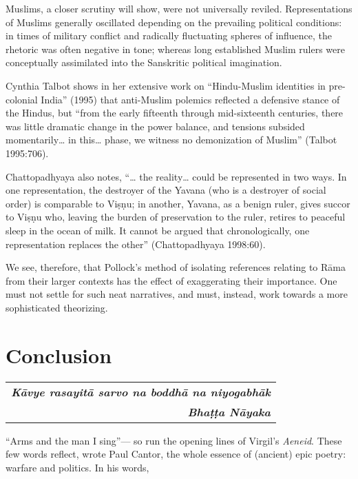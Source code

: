 Muslims, a closer scrutiny will show, were not universally reviled. Representations of Muslims generally oscillated depending on the prevailing political conditions: in times of military conflict and radically fluctuating spheres of influence, the rhetoric was often negative in tone; whereas long established Muslim rulers were conceptually assimilated into the Sanskritic political imagination. 

Cynthia Talbot shows in her extensive work on “Hindu-Muslim identities in pre-colonial India” (1995) that anti-Muslim polemics reflected a defensive stance of the Hindus, but “from the early fifteenth through mid-sixteenth centuries, there was little dramatic change in the power balance, and tensions subsided momentarily… in this… phase, we witness no demonization of Muslim” (Talbot 1995:706). 

Chattopadhyaya also notes, “… the reality… could be represented in two ways. In one representation, the destroyer of the Yavana (who is a destroyer of social order) is comparable to Viṣṇu; in another, Yavana, as a benign ruler, gives succor to Viṣṇu who, leaving the burden of preservation to the ruler, retires to peaceful sleep in the ocean of milk. It cannot be argued that chronologically, one representation replaces the other” (Chattopadhyaya 1998:60). 

We see, therefore, that Pollock’s method of isolating references relating to Rāma from their larger contexts has the effect of exaggerating their importance. One must not settle for such neat narratives, and must, instead, work towards a more sophisticated theorizing. 

\newpage

\chapter*{Conclusion}\label{conclusion}


\begin{flushright}
\begin{tabular}{r@{}}
{\sl\bfseries Kāvye rasayitā sarvo na boddhā na niyogabhāk}\\[3pt]
{\sl\bfseries  Bhaṭṭa Nāyaka}\index{Bhatta Nayaka@Bhaṭṭa Nāyaka}
\end{tabular}
\end{flushright}

“Arms and the man I sing”— so run the opening lines of Virgil’s {\sl Aeneid}. These few words reflect, wrote Paul Cantor, the whole essence of (ancient) epic poetry: warfare and politics. In his words, 

